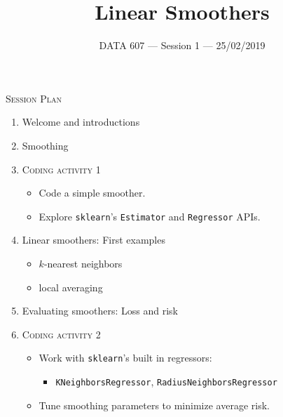 \documentclass{beamer}
\begin{document}
    
\setlength{\parskip}{1em}
\begin{frame}
    \title{Linear Smoothers}
    \date{DATA 607 --- Session 1 --- 25/02/2019}
    \maketitle
\end{frame}


\begin{frame}{\textsc{Session Plan}}
    \begin{enumerate}
        \item Welcome and introductions
        \item Smoothing
        \item \textsc{Coding activity 1}
        \begin{itemize}
            \item Code a simple smoother.
            \item Explore \texttt{sklearn}'s \texttt{Estimator} and \texttt{Regressor} APIs.
        \end{itemize}
        \item Linear smoothers: First examples
        \begin{itemize}
            \item $k$-nearest neighbors
            \item local averaging
        \end{itemize}
        \item Evaluating smoothers: Loss and risk
        \item \textsc{Coding activity 2}
        \begin{itemize}
            \item Work with \texttt{sklearn}'s built in regressors:
            \begin{itemize}
                \item \texttt{KNeighborsRegressor}, \texttt{RadiusNeighborsRegressor}
            \end{itemize}
            \item Tune smoothing parameters to minimize average risk.
        \end{itemize}
    \end{enumerate}
\end{frame}
\end{document}
